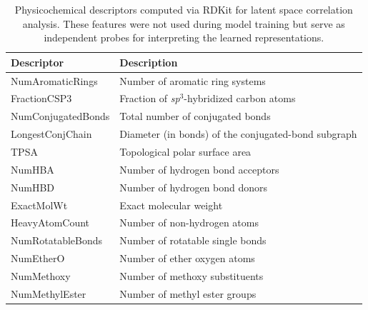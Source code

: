 \begin{table}[ht]
\centering
\caption{Physicochemical descriptors computed via RDKit for latent space correlation analysis. These features were not used during model training but serve as independent probes for interpreting the learned representations.}
\label{tab:chemical-descriptors}
\begin{tabular}{ll}
\toprule
\textbf{Descriptor} & \textbf{Description} \\
\midrule
NumAromaticRings & Number of aromatic ring systems \\
FractionCSP3 & Fraction of \textit{sp}$^3$-hybridized carbon atoms \\
NumConjugatedBonds & Total number of conjugated bonds \\
LongestConjChain & Diameter (in bonds) of the conjugated-bond subgraph \\
TPSA & Topological polar surface area \\
NumHBA & Number of hydrogen bond acceptors \\
NumHBD & Number of hydrogen bond donors \\
ExactMolWt & Exact molecular weight \\
HeavyAtomCount & Number of non-hydrogen atoms \\
NumRotatableBonds & Number of rotatable single bonds \\
NumEtherO & Number of ether oxygen atoms \\
NumMethoxy & Number of methoxy substituents \\
NumMethylEster & Number of methyl ester groups \\
\bottomrule
\end{tabular}
\end{table}

